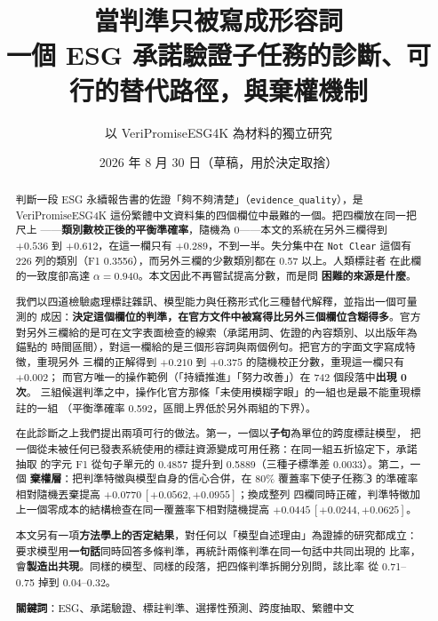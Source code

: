 \documentclass[11pt,a4paper]{ctexart}
\title{\textbf{當判準只被寫成形容詞}\\[0.3em]
       \large 一個 ESG 承諾驗證子任務的診斷、可行的替代路徑，與棄權機制}
\author{以 VeriPromiseESG4K 為材料的獨立研究}
\date{2026 年 8 月 30 日\quad（草稿，用於決定取捨）}
\newcommand{\fn}[1]{\texttt{#1}}
\begin{document}
\maketitle

\begin{abstract}
\noindent
判斷一段 ESG 永續報告書的佐證「夠不夠清楚」（\fn{evidence\_quality}），是
VeriPromiseESG4K 這份繁體中文資料集的四個欄位中最難的一個。把四欄放在同一把尺上
——\textbf{類別數校正後的平衡準確率}，隨機為 0——本文的系統在另外三欄得到 $+0.536$
到 $+0.612$，在這一欄只有 $\mathbf{+0.289}$，不到一半。失分集中在 \fn{Not Clear}
這個有 226 列的類別（F1 0.3556），而另外三欄的少數類別都在 0.57 以上。人類標註者
在此欄的一致度卻高達 $\alpha = 0.940$。本文因此不再嘗試提高分數，而是問
\textbf{困難的來源是什麼}。

\medskip
我們以四道檢驗處理標註雜訊、模型能力與任務形式化三種替代解釋，並指出一個可量測的
成因：\textbf{決定這個欄位的判準，在官方文件中被寫得比另外三個欄位含糊得多}。官方
對另外三欄給的是可在文字表面檢查的線索（承諾用詞、佐證的內容類別、以出版年為錨點的
時間區間），對這一欄給的是三個形容詞與兩個例句。把官方的字面文字寫成特徵，重現另外
三欄的正解得到 $+0.210$ 到 $+0.375$ 的隨機校正分數，重現這一欄只有 $\mathbf{+0.002}$；
而官方唯一的操作範例（「持續推進」「努力改善」）在 742 個段落中\textbf{出現 0 次}。
三組候選判準之中，操作化官方那條「未使用模糊字眼」的一組也是最不能重現標註的一組
（平衡準確率 0.592，區間上界低於另外兩組的下界）。

\medskip
在此診斷之上我們提出兩項可行的做法。第一，一個以\textbf{子句}為單位的跨度標註模型，
把一個從未被任何已發表系統使用的標註資源變成可用任務：在同一組五折協定下，承諾抽取
的字元 F1 從句子單元的 0.4857 提升到 0.5889（三種子標準差 0.0033）。第二，一個
\textbf{棄權層}：把判準特徵與模型自身的信心合併，在 80\% 覆蓋率下使子任務
\textcircled{3} 的準確率相對隨機丟棄提高 $+0.0770\,[+0.0562, +0.0955]$；換成整列
四欄同時正確，判準特徵加上一個零成本的結構檢查在同一覆蓋率下相對隨機提高
$+0.0445\,[+0.0244, +0.0625]$。

\medskip
本文另有一項\textbf{方法學上的否定結果}，對任何以「模型自述理由」為證據的研究都成立：
要求模型用\textbf{一句話}同時回答多條判準，再統計兩條判準在同一句話中共同出現的
比率，會\textbf{製造出共現}。同樣的模型、同樣的段落，把四條判準拆開分別問，該比率
從 0.71--0.75 掉到 0.04--0.32。

\medskip
\textbf{關鍵詞}：ESG、承諾驗證、標註判準、選擇性預測、跨度抽取、繁體中文
\end{abstract}
\end{document}
